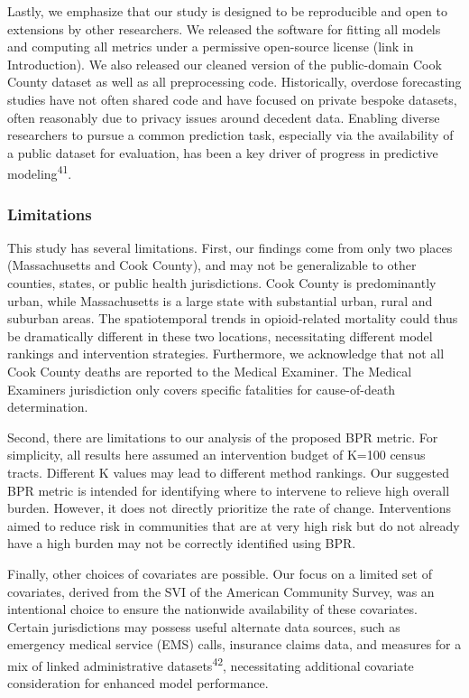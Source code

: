 Lastly, we emphasize that our study is designed to be reproducible and open to extensions by other researchers. We released the software for fitting all models and computing all metrics under a permissive open-source license (link in Introduction). We also released our cleaned version of the public-domain Cook County dataset as well as all preprocessing code. Historically, overdose forecasting studies have not often shared code and have focused on private bespoke datasets, often reasonably due to privacy issues around decedent data. Enabling diverse researchers to pursue a common prediction task, especially via the availability of a public dataset for evaluation, has been a key driver of progress in predictive modeling\textsuperscript{41}.

\subsubsection{Limitations}\label{limitations}

This study has several limitations. First, our findings come from only two places (Massachusetts and Cook County), and may not be generalizable to other counties, states, or public health jurisdictions. Cook County is predominantly urban, while Massachusetts is a large state with substantial urban, rural and suburban areas. The spatiotemporal trends in opioid-related mortality could thus be dramatically different in these two locations, necessitating different model rankings and intervention strategies. Furthermore, we acknowledge that not all Cook County deaths are reported to the Medical Examiner. The Medical Examiner\textquotesingle s jurisdiction only covers specific fatalities for cause-of-death determination.

Second, there are limitations to our analysis of the proposed BPR metric. For simplicity, all results here assumed an intervention budget of K=100 census tracts. Different K values may lead to different method rankings. Our suggested BPR metric is intended for identifying where to intervene to relieve high overall burden. However, it does not directly prioritize the rate of change. Interventions aimed to reduce risk in communities that are at very high risk but do not already have a high burden may not be correctly identified using BPR.

Finally, other choices of covariates are possible. Our focus on a limited set of covariates, derived from the SVI of the American Community Survey, was an intentional choice to ensure the nationwide availability of these covariates. Certain jurisdictions may possess useful alternate data sources, such as emergency medical service (EMS) calls, insurance claims data, and measures for a mix of linked administrative datasets\textsuperscript{42}, necessitating additional covariate consideration for enhanced model performance.

